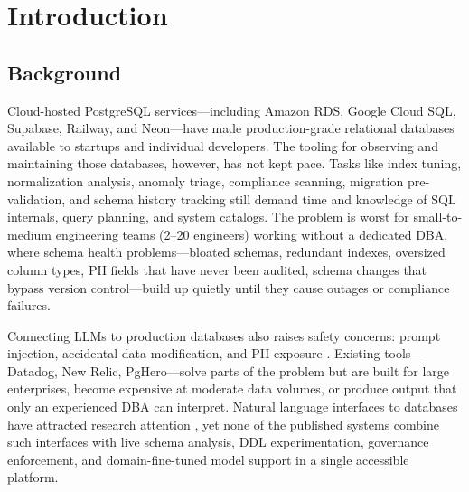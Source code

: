 \documentclass[12pt,a4paper]{report}
\begin{document}
\newpage
\tableofcontents

\newpage
\listoffigures

\newpage
\listoftables

\newpage
{}
\setcounter{page}{1}

\chapter{Introduction}

\section{Background}

Cloud-hosted PostgreSQL services---including Amazon RDS, Google Cloud SQL, Supabase, Railway, and Neon---have made production-grade relational databases available to startups and individual developers. The tooling for observing and maintaining those databases, however, has not kept pace. Tasks like index tuning, normalization analysis, anomaly triage, compliance scanning, migration pre-validation, and schema history tracking still demand time and knowledge of SQL internals, query planning, and system catalogs. The problem is worst for small-to-medium engineering teams (2--20 engineers) working without a dedicated DBA, where schema health problems---bloated schemas, redundant indexes, oversized column types, PII fields that have never been audited, schema changes that bypass version control---build up quietly until they cause outages or compliance failures.

Connecting LLMs to production databases also raises safety concerns: prompt injection, accidental data modification, and PII exposure \cite{perez2022ignore,greshake2023indirect}. Existing tools---Datadog, New Relic, PgHero---solve parts of the problem but are built for large enterprises, become expensive at moderate data volumes, or produce output that only an experienced DBA can interpret. Natural language interfaces to databases have attracted research attention \cite{li2023can,pourreza2024din,gao2023texttosql}, yet none of the published systems combine such interfaces with live schema analysis, DDL experimentation, governance enforcement, and domain-fine-tuned model support in a single accessible platform.
\end{document}
